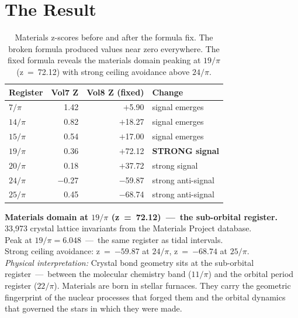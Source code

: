 \documentclass[11pt, letterpaper, openany]{book}
\begin{document}
\section{The Result}

\begin{table}[H]
\centering
\renewcommand{\arraystretch}{1.3}
\begin{tabular}{|l|r|r|l|}
\hline
\rowcolor{kishblue!10}
\textbf{Register} & \textbf{Vol7 Z} & \textbf{Vol8 Z (fixed)} & \textbf{Change} \\
\hline\hline
$7/\pi$  &  1.42 & $+$5.90 & signal emerges \\
$14/\pi$ &  0.82 & $+$18.27 & signal emerges \\
$15/\pi$ &  0.54 & $+$17.00 & signal emerges \\
$19/\pi$ &  0.36 & $+$72.12 & \textbf{STRONG signal} \\
$20/\pi$ &  0.18 & $+$37.72 & strong signal \\
$24/\pi$ & $-$0.27 & $-$59.87 & strong anti-signal \\
$25/\pi$ &  0.45 & $-$68.74 & strong anti-signal \\
\hline
\end{tabular}
\caption{Materials z-scores before and after the formula fix. The broken formula
produced values near zero everywhere. The fixed formula reveals the materials
domain peaking at $19/\pi$ (z~=~72.12) with strong ceiling avoidance above $24/\pi$.}
\label{tab:materials_before_after}
\end{table}

\begin{signalbox}
\textbf{Materials domain at $19/\pi$ (z~=~72.12)~---~the sub-orbital register.}\\[0.5em]
33,973 crystal lattice invariants from the Materials Project database.\\
Peak at $19/\pi = 6.048$~---~the same register as tidal intervals.\\
Strong ceiling avoidance: z~=~$-59.87$ at $24/\pi$, z~=~$-68.74$ at $25/\pi$.\\[0.5em]
\textit{Physical interpretation:} Crystal bond geometry sits at the sub-orbital
register~---~between the molecular chemistry band ($11/\pi$) and the orbital period
register ($22/\pi$). Materials are born in stellar furnaces. They carry the
geometric fingerprint of the nuclear processes that forged them and the orbital
dynamics that governed the stars in which they were made.
\end{signalbox}
\end{document}

